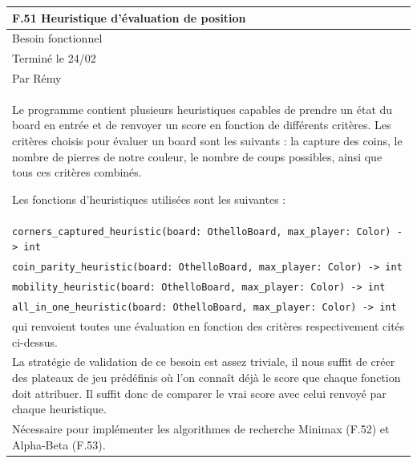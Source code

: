 \documentclass[a4paper,12pt]{article}
\begin{document}
\noindent
\setlength{\arrayrulewidth}{1.5pt}
\renewcommand{\arraystretch}{1.5}
\begin{tabularx}{\textwidth}{|X|}
    \hline
    \textbf{F.51 Heuristique d’évaluation de position}                                    \\
    \hline
    Besoin fonctionnel                                                                    \\
    \hline
    Terminé le 24/02                                                                      \\
    Par Rémy                                                                              \\
    \hline
    Le programme contient plusieurs heuristiques capables de prendre un état du board en entrée et de renvoyer un score en fonction de différents critères.
    Les critères choisis pour évaluer un board sont les suivants : la capture des coins, le nombre de pierres de notre couleur, le nombre de coups possibles, ainsi que tous ces critères combinés.

    Les fonctions d’heuristiques utilisées sont les suivantes :                           \\

    \texttt{corners\_captured\_heuristic(board: OthelloBoard, max\_player: Color) -> int} \\
    \texttt{coin\_parity\_heuristic(board: OthelloBoard, max\_player: Color) -> int}      \\
    \texttt{mobility\_heuristic(board: OthelloBoard, max\_player: Color) -> int}          \\
    \texttt{all\_in\_one\_heuristic(board: OthelloBoard, max\_player: Color) -> int}      \\

    qui renvoient toutes une évaluation en fonction des critères respectivement
    cités ci-dessus.                                                                      \\ \arrayrulecolor{MediumAquamarine}\hline
    \arrayrulecolor{CornflowerBlue} La stratégie de validation de ce besoin est
    assez triviale, il nous suffit de créer des plateaux de jeu prédéfinis où l’on
    connaît déjà le score que chaque fonction doit attribuer. Il suffit donc de
    comparer le vrai score avec celui renvoyé par chaque heuristique.                     \\
    \arrayrulecolor{MediumAquamarine}\hline \arrayrulecolor{CornflowerBlue}
    Nécessaire pour implémenter les algorithmes de recherche Minimax (F.52) et
    Alpha-Beta (F.53).                                                                    \\ \hline
\end{tabularx}
\end{document}
